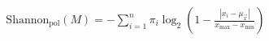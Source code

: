 \documentclass[preview]{standalone}
\begin{document}
\begin{align*}
\text{Shannon}_{\text{pol}}(M) = -\sum_{i=1}^{n} \pi_i \log_2 \left( 1 - \frac{|x_i - \mu_{\vec{x}}|}{x_{\max} - x_{\min}} \right)
\end{align*}
\end{document}
